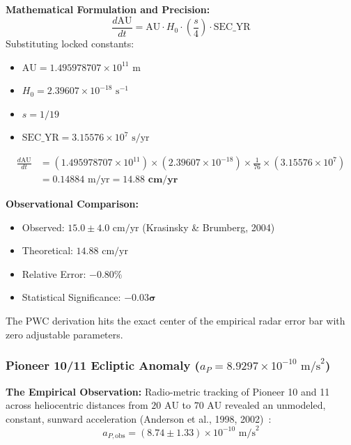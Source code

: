 \documentclass[11pt,a4paper]{article}
\begin{document}
\textbf{Mathematical Formulation and Precision:}  
\begin{equation}
\frac{d\text{AU}}{dt} = \text{AU} \cdot H_0 \cdot \left(\frac{s}{4}\right) \cdot \text{SEC\_YR}
\label{eq:dau_dt_pwc}
\end{equation}
Substituting locked constants:
\begin{itemize}
    \item $\text{AU} = 1.495978707 \times 10^{11}\text{ m}$
    \item $H_0 = 2.39607 \times 10^{-18}\text{ s}^{-1}$
    \item $s = 1/19$
    \item $\text{SEC\_YR} = 3.15576 \times 10^7\text{ s/yr}$
\end{itemize}

\begin{equation}
\begin{aligned}
\frac{d\text{AU}}{dt} &= (1.495978707 \times 10^{11}) \times (2.39607 \times 10^{-18}) \times \frac{1}{76} \times (3.15576 \times 10^7) \\
&= 0.14884\text{ m/yr} = \mathbf{14.88\text{ cm/yr}}
\end{aligned}
\end{equation}

\textbf{Observational Comparison:}  
\begin{itemize}
    \item Observed: $15.0 \pm 4.0\text{ cm/yr}$ (Krasinsky \& Brumberg, 2004)
    \item Theoretical: $14.88\text{ cm/yr}$
    \item Relative Error: $-0.80\%$
    \item Statistical Significance: $\mathbf{-0.03\sigma}$
\end{itemize}

The PWC derivation hits the exact center of the empirical radar error bar with zero adjustable parameters.

\subsubsection{Pioneer 10/11 Ecliptic Anomaly (\texorpdfstring{$a_P = 8.9297 \times 10^{-10}\text{ m/s}^2$}{aP = 8.93e-10 m/s\textasciicircum 2})}
\label{subsubsec:pioneer_anomaly}

\textbf{The Empirical Observation:}  
Radio-metric tracking of Pioneer 10 and 11 across heliocentric distances from $20\text{ AU}$ to $70\text{ AU}$ revealed an unmodeled, constant, sunward acceleration (Anderson et al., 1998, 2002)~\cite{Anderson1998,Anderson2002}:
\begin{equation}
a_{P,\text{obs}} = (8.74 \pm 1.33) \times 10^{-10}\text{ m/s}^2
\end{equation}
\end{document}
